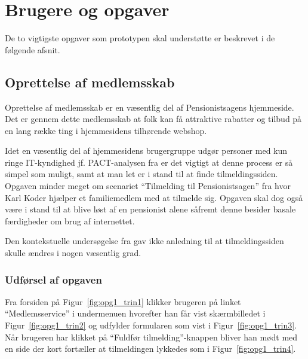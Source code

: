 \section{Brugere og opgaver}

De to vigtigste opgaver som prototypen skal understøtte er beskrevet i de
følgende afsnit.

\subsection{Oprettelse af medlemsskab}

Oprettelse af medlemsskab er en væsentlig del af Pensionistsagens hjemmeside.
Det er gennem dette medlemsskab at folk kan få attraktive rabatter og tilbud
på en lang række ting i hjemmesidens tilhørende webshop.

Idet en væsentlig del af hjemmesidens brugergruppe udgør personer med kun
ringe IT-kyndighed jf. PACT-analysen fra \cite{opgave2} er det vigtigt at
denne process er så simpel som muligt, samt at man let er i stand til at
finde tilmeldingssiden. Opgaven minder meget om scenariet ``Tilmelding til
Pensionistsagen'' fra \cite{opgave2} hvor Karl Koder hjælper et familiemedlem
med at tilmelde sig. Opgaven skal dog også være i stand til at blive løst
af en pensionist alene såfremt denne besider basale færdigheder om brug af
internettet.

Den kontekstuelle undersøgelse fra \cite{opgave3} gav ikke anledning til at
tilmeldingssiden skulle ændres i nogen væsentlig grad.

\subsubsection{Udførsel af opgaven}

Fra forsiden på Figur~\ref{fig:opg1_trin1} klikker brugeren på
linket ``Medlemsservice'' i undermenuen hvorefter han får vist
skærmbilledet i Figur~\ref{fig:opg1_trin2} og udfylder formularen som vist
i Figur~\ref{fig:opg1_trin3}. Når brugeren har klikket på ``Fuldfør
tilmelding''-knappen bliver han mødt med en side der kort fortæller at
tilmeldingen lykkedes som i Figur~\ref{fig:opg1_trin4}.

